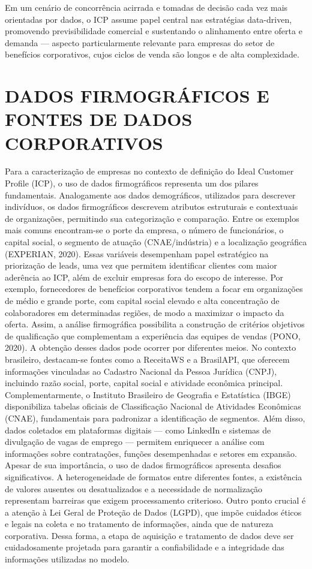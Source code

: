 Em um cenário de concorrência acirrada e tomadas de decisão cada vez mais orientadas por dados, o ICP assume papel central nas estratégias data-driven, promovendo previsibilidade comercial e sustentando o alinhamento entre oferta e demanda — aspecto particularmente relevante para empresas do setor de benefícios corporativos, cujos ciclos de venda são longos e de alta complexidade.
\section{DADOS FIRMOGRÁFICOS E FONTES DE DADOS CORPORATIVOS}

Para a caracterização de empresas no contexto de definição do Ideal Customer Profile (ICP), o uso de dados firmográficos representa um dos pilares fundamentais. Analogamente aos dados demográficos, utilizados para descrever indivíduos, os dados firmográficos descrevem atributos estruturais e contextuais de organizações, permitindo sua categorização e comparação. Entre os exemplos mais comuns encontram-se o porte da empresa, o número de funcionários, o capital social, o segmento de atuação (CNAE/indústria) e a localização geográfica (EXPERIAN, 2020).
Essas variáveis desempenham papel estratégico na priorização de leads, uma vez que permitem identificar clientes com maior aderência ao ICP, além de excluir empresas fora do escopo de interesse. Por exemplo, fornecedores de benefícios corporativos tendem a focar em organizações de médio e grande porte, com capital social elevado e alta concentração de colaboradores em determinadas regiões, de modo a maximizar o impacto da oferta. Assim, a análise firmográfica possibilita a construção de critérios objetivos de qualificação que complementam a experiência das equipes de vendas (PONO, 2020).
A obtenção desses dados pode ocorrer por diferentes meios. No contexto brasileiro, destacam-se fontes como a ReceitaWS e a BrasilAPI, que oferecem informações vinculadas ao Cadastro Nacional da Pessoa Jurídica (CNPJ), incluindo razão social, porte, capital social e atividade econômica principal. Complementarmente, o Instituto Brasileiro de Geografia e Estatística (IBGE) disponibiliza tabelas oficiais de Classificação Nacional de Atividades Econômicas (CNAE), fundamentais para padronizar a identificação de segmentos. Além disso, dados coletados em plataformas digitais — como LinkedIn e sistemas de divulgação de vagas de emprego — permitem enriquecer a análise com informações sobre contratações, funções desempenhadas e setores em expansão.
Apesar de sua importância, o uso de dados firmográficos apresenta desafios significativos. A heterogeneidade de formatos entre diferentes fontes, a existência de valores ausentes ou desatualizados e a necessidade de normalização representam barreiras que exigem processamento criterioso. Outro ponto crucial é a atenção à Lei Geral de Proteção de Dados (LGPD), que impõe cuidados éticos e legais na coleta e no tratamento de informações, ainda que de natureza corporativa. Dessa forma, a etapa de aquisição e tratamento de dados deve ser cuidadosamente projetada para garantir a confiabilidade e a integridade das informações utilizadas no modelo.


